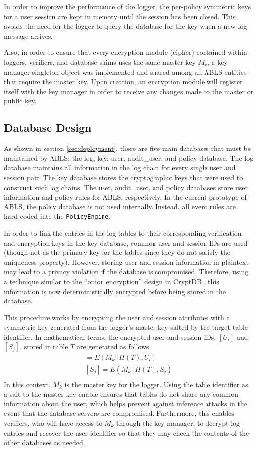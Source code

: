 \documentclass{sig-alternate}
\begin{document}
In order to improve the performance of the logger, the per-policy symmetric keys for a user session are kept
in memory until the session has been closed. This avoids the need for the logger to query the database for the key 
when a new log message arrives. 

Also, in order to ensure that every encryption module (cipher) contained within loggers, verifiers, and database 
shims uses the same master key $M_k$, a key manager singleton object was implemented and shared among
all ABLS entities that require the master key. Upon creation, an encryption module will register itself with the key
manager in order to receive any changes made to the master or public key.

\subsection{Database Design}
\label{sec:databaseDesign}

As shown in section \ref{sec:deployment}, there are five main databases that must be maintained by ABLS:
the log, key, user, audit\_user, and policy database. The log database maintains all information in the log chain for every 
single user and session pair. The key database stores the cryptographic keys that were used to construct
such log chains. The user, audit\_user, and policy databases store user information and policy rules for ABLS, respectively. 
In the current prototype of ABLS, the policy database is not used internally. Instead, all event rules are 
hard-coded into the {\tt PolicyEngine}. 

In order to link the entries in the log tables to their corresponding verification and encryption keys in the key database,
common user and session IDs are used (though not as the primary key for the tables since they do not satisfy
the uniqueness property). However, storing user and session information in plaintext may lead to a privacy violation
if the database is compromised. Therefore, using a technique similar to the ``onion encryption'' design in
CryptDB \cite{Popa2012-CryptDB}, this information is now deterministically encrypted before being stored in the database.

This procedure works by encrypting the user and session attributes with a symmetric key generated
from the logger's master key salted by the target table identifier. In mathematical
terms, the encrypted user and session IDs, $[U_i]$ and $[S_j]$, stored in table $T$ are generated as follows.
\begin{align*}
[U_i] = E(M_k || H(T), U_i) \\
[S_j] = E(M_k || H(T), S_j) \\
\end{align*}
In this context, $M_k$ is the master key for the logger. Using the table identifier as a salt to the master key 
enable ensures that tables do not share any common information about the user, which helps prevent against 
inference attacks in the event that the database servers are compromised. Furthermore, this enables verifiers,
who will have access to $M_k$ through the key manager, to decrypt log entries and recover the user identifier 
so that they may check the contents of the other databases as needed.
\end{document}
